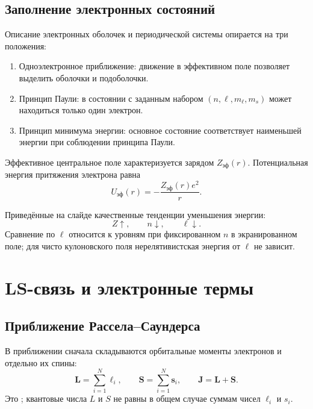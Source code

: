 \documentclass[../final.tex]{subfiles}
\begin{document}
\subsection{Заполнение электронных состояний}

Описание электронных оболочек и периодической системы опирается
на три положения:
\begin{enumerate}
    \item Одноэлектронное приближение: движение в эффективном поле
    позволяет выделить оболочки и подоболочки.
    \item Принцип Паули: в состоянии с заданным набором
    \((n,\ell,m_\ell,m_s)\) может находиться только один электрон.
    \item Принцип минимума энергии: основное состояние соответствует
    наименьшей энергии при соблюдении принципа Паули.
\end{enumerate}
Эффективное центральное поле характеризуется зарядом
\(Z_{\text{эф}}(r)\). Потенциальная энергия притяжения электрона равна
\begin{equation*}
    U_{\text{эф}}(r)=-\frac{Z_{\text{эф}}(r)e^2}{r}.
\end{equation*}

Приведённые на слайде качественные тенденции уменьшения энергии:
\begin{equation*}
    Z\uparrow,\qquad n\downarrow,\qquad\ell\downarrow.
\end{equation*}
Сравнение по \(\ell\) относится к уровням при фиксированном \(n\)
в экранированном поле; для чисто кулоновского поля нерелятивистская
энергия от \(\ell\) не зависит.

\section{LS-связь и электронные термы}

\subsection{Приближение Рассела--Саундерса}

В приближении  сначала складываются
орбитальные моменты электронов и отдельно их спины:
\begin{equation*}
    \mathbf L=\sum_{i=1}^{N}\boldsymbol\ell_i,
    \qquad \mathbf S=\sum_{i=1}^{N}\mathbf s_i,
    \qquad \mathbf J=\mathbf L+\mathbf S.
\end{equation*}
Это ; квантовые числа
\(L\) и \(S\) не равны в общем случае суммам чисел \(\ell_i\) и \(s_i\).
\end{document}
